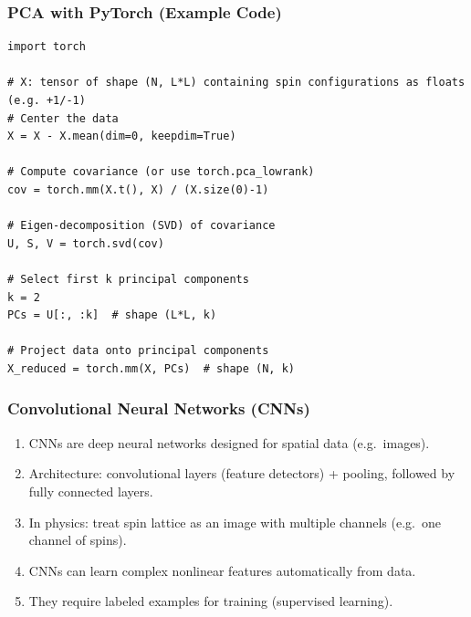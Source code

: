 \documentclass{beamer}
\begin{document}
\begin{frame}
\frametitle{PCA with PyTorch (Example Code)}

\begin{verbatim}
import torch

# X: tensor of shape (N, L*L) containing spin configurations as floats (e.g. +1/-1)
# Center the data
X = X - X.mean(dim=0, keepdim=True)

# Compute covariance (or use torch.pca_lowrank)
cov = torch.mm(X.t(), X) / (X.size(0)-1)

# Eigen-decomposition (SVD) of covariance
U, S, V = torch.svd(cov)

# Select first k principal components
k = 2
PCs = U[:, :k]  # shape (L*L, k)

# Project data onto principal components
X_reduced = torch.mm(X, PCs)  # shape (N, k)

\end{verbatim}
\end{frame}

\begin{frame}
\frametitle{Convolutional Neural Networks (CNNs)}

\begin{enumerate}
\item CNNs are deep neural networks designed for spatial data (e.g.~images).

\item Architecture: convolutional layers (feature detectors) + pooling, followed by fully connected layers.

\item In physics: treat spin lattice as an image with multiple channels (e.g.\ one channel of spins).

\item CNNs can learn complex nonlinear features automatically from data.

\item They require labeled examples for training (supervised learning).
\end{enumerate}

\noindent
\end{frame}
\end{document}
